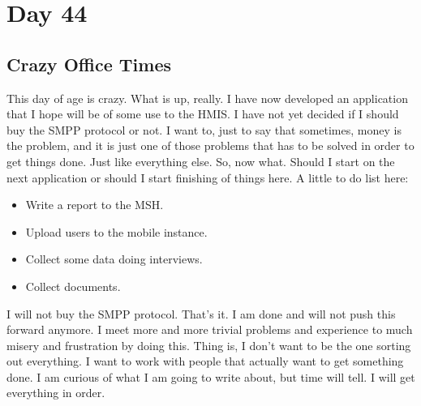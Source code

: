 \section{Day 44}
\subsection{Crazy Office Times}
This day of age is crazy.
What is up, really.
I have now developed an application that I hope will be of some use to the HMIS.
I have not yet decided if I should buy the SMPP protocol or not.
I want to, just to say that sometimes, money is the problem, and it is just one of those problems that has to be solved in order to get things done.
Just like everything else. So, now what. Should I start on the next application or should I start finishing of things here.
A little to do list here:
\begin{itemize}
\item Write a report to the MSH.
\item Upload users to the mobile instance.
\item Collect some data doing interviews.
\item Collect documents.
\end{itemize}
I will not buy the SMPP protocol. That's it.
I am done and will not push this forward anymore.
I meet more and more trivial problems and experience to much misery and frustration by doing this.
Thing is, I don't want to be the one sorting out everything.
I want to work with people that actually want to get something done.
I am curious of what I am going to write about, but time will tell.
I will get everything in order.